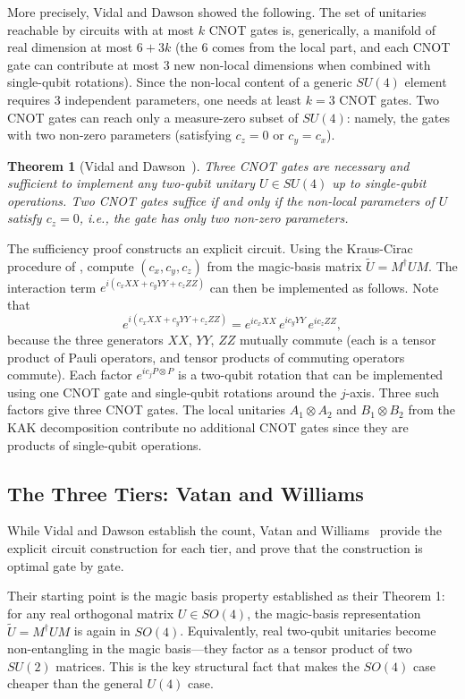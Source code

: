 \documentclass[12pt, a4paper, oneside]{report}
\theoremstyle{plain}
\newtheorem{theorem}{Theorem}[chapter]
\theoremstyle{definition}
\theoremstyle{remark}
\begin{document}
More precisely, Vidal and Dawson showed the following. The set of unitaries reachable by
circuits with at most $k$ CNOT gates is, generically, a manifold of real dimension at most
$6 + 3k$ (the 6 comes from the local part, and each CNOT gate can contribute at most 3
new non-local dimensions when combined with single-qubit rotations). Since the non-local
content of a generic $SU(4)$ element requires 3 independent parameters, one needs at least
$k = 3$ CNOT gates. Two CNOT gates can reach only a measure-zero subset of $SU(4)$: namely,
the gates with two non-zero parameters (satisfying $c_z = 0$ or $c_y = c_x$).

\begin{theorem}[Vidal and Dawson~\cite{vidal2004}]
	\label{vidal-dawson}
	Three CNOT gates are necessary and sufficient to implement any two-qubit unitary
	$U \in SU(4)$ up to single-qubit operations. Two CNOT gates suffice if and only if the
	non-local parameters of $U$ satisfy $c_z = 0$, i.e., the gate has only two non-zero
	parameters.
\end{theorem}

The sufficiency proof constructs an explicit circuit. Using the Kraus-Cirac procedure of
, compute $(c_x, c_y, c_z)$ from the magic-basis matrix $\tilde{U}
	= M^\dagger U M$. The interaction term $e^{i(c_x XX + c_y YY + c_z ZZ)}$ can then be
implemented as follows. Note that
\[
	e^{i(c_x XX + c_y YY + c_z ZZ)}
	= e^{ic_x XX}\,e^{ic_y YY}\,e^{ic_z ZZ},
\]
because the three generators $XX$, $YY$, $ZZ$ mutually commute (each is a tensor product of
Pauli operators, and tensor products of commuting operators commute). Each factor
$e^{ic_j P\otimes P}$ is a two-qubit rotation that can be implemented using one CNOT gate
and single-qubit rotations around the $j$-axis. Three such factors give three CNOT gates.
The local unitaries $A_1 \otimes A_2$ and $B_1 \otimes B_2$ from the KAK decomposition
contribute no additional CNOT gates since they are products of single-qubit operations.

\subsection{The Three Tiers: Vatan and Williams}

While Vidal and Dawson establish the count, Vatan and Williams~\cite{vatan2004} provide the
explicit circuit construction for each tier, and prove that the construction is optimal gate
by gate.

Their starting point is the magic basis property established as their Theorem 1: for any
real orthogonal matrix $U \in SO(4)$, the magic-basis representation $\tilde{U} = M^\dagger
	U M$ is again in $SO(4)$. Equivalently, real two-qubit unitaries become non-entangling in
the magic basis---they factor as a tensor product of two $SU(2)$ matrices. This is the key
structural fact that makes the $SO(4)$ case cheaper than the general $U(4)$ case.
\end{document}

